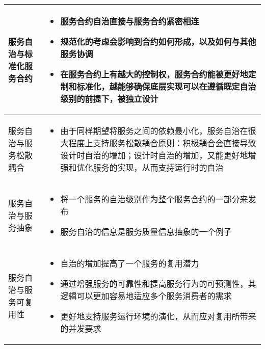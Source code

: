 \begin{longtable}{|m{3cm}<{\centering}|m{12cm}|}
    \hline
    服务自治与标准化服务合约
    & 
    \vspace{-1.3em}
    \begin{itemize}[leftmargin=1.5em,itemsep=-3pt,topsep=-3pt]
        \item 服务合约自治直接与服务合约紧密相连
        \item 规范化的考虑会影响到合约如何形成，以及如何与其他服务协调
        \item 在服务合约上有越大的控制权，服务合约能被更好地定制和标准化，越能够确保底层实现可以在遵循既定自治级别的前提下，被独立设计
    \vspace{-1.5em}
    \end{itemize}  
    \\ \hline
    服务自治与服务松散耦合
    & 
    \vspace{-1.3em}
    \begin{itemize}[leftmargin=1.5em,itemsep=-3pt,topsep=-3pt]
        \item 由于同样期望将服务之间的依赖最小化，服务自治在很大程度上支持服务松散耦合原则：积极耦合会直接导致设计时自治的增加；设计时自治的增加，又能更好地增强和优化服务的实现，从而支持运行时的自治
    \vspace{-1.5em}
    \end{itemize}  
    \\ \hline
    服务自治与服务抽象
    & 
    \vspace{-1.3em}
    \begin{itemize}[leftmargin=1.5em,itemsep=-3pt,topsep=-3pt]
        \item 将一个服务的自治级别作为整个服务合约的一部分来发布
        \item 服务自治的信息是服务质量信息抽象的一个例子
    \vspace{-1.5em}
    \end{itemize}  
    \\ \hline
    服务自治与服务可复用性
    & 
    \vspace{-1.3em}
    \begin{itemize}[leftmargin=1.5em,itemsep=-3pt,topsep=-3pt]
        \item 自治的增加提高了一个服务的复用潜力
        \item 通过增强服务的可靠性和提高服务行为的可预测性，其逻辑可以更加容易地适应多个服务消费者的需求
        \item 更好地支持服务运行环境的演化，从而应对复用所带来的并发要求 
    \vspace{-1.5em}

\end{itemize}
\end{longtable}

